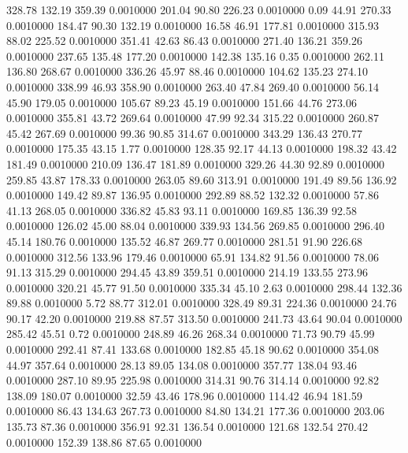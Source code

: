  328.78  132.19  359.39   0.0010000
 201.04   90.80  226.23   0.0010000
   0.09   44.91  270.33   0.0010000
 184.47   90.30  132.19   0.0010000
  16.58   46.91  177.81   0.0010000
 315.93   88.02  225.52   0.0010000
 351.41   42.63   86.43   0.0010000
 271.40  136.21  359.26   0.0010000
 237.65  135.48  177.20   0.0010000
 142.38  135.16    0.35   0.0010000
 262.11  136.80  268.67   0.0010000
 336.26   45.97   88.46   0.0010000
 104.62  135.23  274.10   0.0010000
 338.99   46.93  358.90   0.0010000
 263.40   47.84  269.40   0.0010000
  56.14   45.90  179.05   0.0010000
 105.67   89.23   45.19   0.0010000
 151.66   44.76  273.06   0.0010000
 355.81   43.72  269.64   0.0010000
  47.99   92.34  315.22   0.0010000
 260.87   45.42  267.69   0.0010000
  99.36   90.85  314.67   0.0010000
 343.29  136.43  270.77   0.0010000
 175.35   43.15    1.77   0.0010000
 128.35   92.17   44.13   0.0010000
 198.32   43.42  181.49   0.0010000
 210.09  136.47  181.89   0.0010000
 329.26   44.30   92.89   0.0010000
 259.85   43.87  178.33   0.0010000
 263.05   89.60  313.91   0.0010000
 191.49   89.56  136.92   0.0010000
 149.42   89.87  136.95   0.0010000
 292.89   88.52  132.32   0.0010000
  57.86   41.13  268.05   0.0010000
 336.82   45.83   93.11   0.0010000
 169.85  136.39   92.58   0.0010000
 126.02   45.00   88.04   0.0010000
 339.93  134.56  269.85   0.0010000
 296.40   45.14  180.76   0.0010000
 135.52   46.87  269.77   0.0010000
 281.51   91.90  226.68   0.0010000
 312.56  133.96  179.46   0.0010000
  65.91  134.82   91.56   0.0010000
  78.06   91.13  315.29   0.0010000
 294.45   43.89  359.51   0.0010000
 214.19  133.55  273.96   0.0010000
 320.21   45.77   91.50   0.0010000
 335.34   45.10    2.63   0.0010000
 298.44  132.36   89.88   0.0010000
   5.72   88.77  312.01   0.0010000
 328.49   89.31  224.36   0.0010000
  24.76   90.17   42.20   0.0010000
 219.88   87.57  313.50   0.0010000
 241.73   43.64   90.04   0.0010000
 285.42   45.51    0.72   0.0010000
 248.89   46.26  268.34   0.0010000
  71.73   90.79   45.99   0.0010000
 292.41   87.41  133.68   0.0010000
 182.85   45.18   90.62   0.0010000
 354.08   44.97  357.64   0.0010000
  28.13   89.05  134.08   0.0010000
 357.77  138.04   93.46   0.0010000
 287.10   89.95  225.98   0.0010000
 314.31   90.76  314.14   0.0010000
  92.82  138.09  180.07   0.0010000
  32.59   43.46  178.96   0.0010000
 114.42   46.94  181.59   0.0010000
  86.43  134.63  267.73   0.0010000
  84.80  134.21  177.36   0.0010000
 203.06  135.73   87.36   0.0010000
 356.91   92.31  136.54   0.0010000
 121.68  132.54  270.42   0.0010000
 152.39  138.86   87.65   0.0010000
